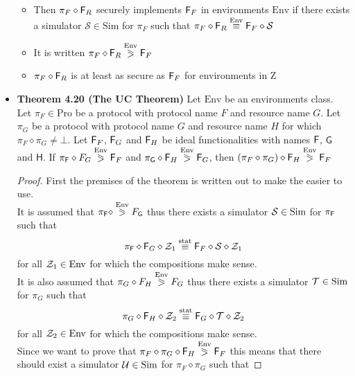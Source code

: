 \begin{itemize}
  \begin{itemize}
  	\item Then $\pi_F \diamond \mathsf{F}_R$ securely implements $\mathsf{F}_F$ in environments $\text{Env}$ if there exists a simulator $\mathcal S \in \text{Sim}$ for $\pi_F$ such that $\pi_{F} \diamond \mathsf{F}_R \stackrel{\text{Env}}{\equiv} \mathsf{F}_F \diamond \mathcal S$
  	\item It is written $\pi_F \diamond \mathsf{F}_R \stackrel{\text{Env}}{\eqslantgtr} \mathsf{F}_F$
  	\item $\pi_F \diamond \mathsf{F}_R$ is at least as secure as $\mathsf{F}_F$ for environments in $\text{Z}$
  \end{itemize}
  \item \textbf{Theorem 4.20 (The UC Theorem)} Let $\text{Env}$ be an environments class. Let $\pi_F \in \text{Pro}$ be a protocol with protocol name $F$ and resource name $G$. Let $\pi_G$ be a protocol with protocol name $G$ and resource name $H$ for which $\pi_F \diamond \pi_G \neq \bot$. Let $\mathsf{F}_F$, $\mathsf{F}_G$ and $\mathsf{F}_H$ be ideal functionalities with names $\mathsf{F}$, $\mathsf{G}$ and $\mathsf{H}$. If $\pi_{\mathsf{F}} \diamond F_G \stackrel{\text{Env}}{\eqslantgtr} \mathsf{F}_{F}$ and $\pi_{\mathsf{G}} \diamond \mathsf{F}_H \stackrel{\text{Env}}{\eqslantgtr} \mathsf{F}_{G}$, then $(\pi_F \diamond \pi_G) \diamond \mathsf{F}_H \stackrel{\text{Env}}{\eqslantgtr} \mathsf{F}_F$
  \begin{proof}
    First the premises of the theorem is written out to make the easier to use. \\
    It is assumed that $\pi_{\mathsf{F}} \diamond \stackrel{\text{Env}}{\eqslantgtr} F_{\mathsf{G}}$ thus there exists a simulator $\mathcal S \in \text{Sim}$ for $\pi_{\mathsf{F}}$ such that
    \begin{equation}
      \pi_{\mathsf{F}} \diamond \mathsf{F}_G \diamond \mathcal Z_1 \stackrel{\text{stat}}{\equiv} \mathsf{F}_F \diamond \mathcal S \diamond \mathcal Z_1 \label{eq:uc-assum1}
    \end{equation}
    for all $\mathcal Z_1 \in \text{Env}$ for which the compositions make sense. \smallskip \\
    It is also assumed that $\pi_{G} \diamond F_H \stackrel{\text{Env}}{\eqslantgtr} F_G$ thus there exists a simulator $\mathcal T \in \text{Sim}$ for $\pi_G$ such that
    \begin{equation}  
      \pi_G \diamond \mathsf{F}_H \diamond \mathcal Z_2 \stackrel{\text{stat}}{\equiv} \mathsf{F}_G \diamond \mathcal T \diamond \mathcal Z_2 \label{eq:uc-assum2}
    \end{equation}
    for all $\mathcal Z_2 \in \text{Env}$ for which the compositions make sense. \smallskip \\
    Since we want to prove that $\pi_F \diamond \pi_G \diamond \mathsf{F}_H \stackrel{\text{Env}}{\eqslantgtr} \mathsf{F}_F$ this means that there should exist a simulator $\mathcal U \in \text{Sim}$ for $\pi_F \diamond \pi_G$ such that

\end{proof}
\end{itemize}
